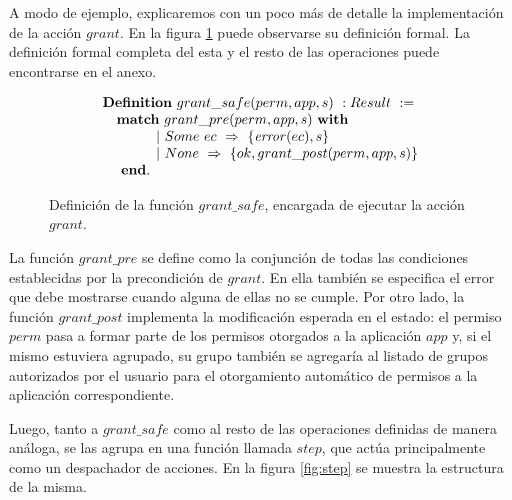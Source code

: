A modo de ejemplo, explicaremos con un poco más de detalle la implementación de la acción $grant$.
En la figura \ref{fig:install_action} puede observarse su definición formal. La definición formal
completa del esta y el resto de las operaciones puede encontrarse en el anexo.

\begin{figure}[ht]
    \begin{displaymath}
        \begin{array}{l}
            \textbf{Definition}\ grant\_safe(perm, app, s)\ : Result\ :=                \\
            \quad \textbf{match}\ grant\_pre(perm, app, s)\ \textbf{with}               \\
            \quad \hspace{1cm} |\ Some\ ec\ \Rightarrow\ \{\ap{error}{ec},s\}           \\
            \quad \hspace{1cm} |\ None\ \Rightarrow\ \{ok, grant\_post(perm, app, s) \} \\
            \quad\ \textbf{end}.                                                        \\
        \end{array}
    \end{displaymath}
    \caption{Definición de la función $grant\_safe$, encargada de ejecutar la acción $grant$.}
    \label{fig:install_action}
\end{figure}

La función $grant\_pre$ se define como la conjunción de todas las condiciones establecidas por la
precondición de $grant$. En ella también se especifica el error que debe mostrarse cuando alguna de
ellas no se cumple. Por otro lado, la función $grant\_post$ implementa la modificación esperada en el
estado: el permiso $perm$ pasa a formar parte de los permisos otorgados a la aplicación $app$ y, si
el mismo estuviera agrupado, su grupo también se agregaría al listado de grupos autorizados por el
usuario para el otorgamiento automático de permisos a la aplicación correspondiente.

Luego, tanto a $grant\_safe$ como al resto de las operaciones definidas de manera análoga, se las
agrupa en una función llamada $step$, que actúa principalmente como un despachador de acciones. En
la figura \ref{fig:step} se muestra la estructura de la misma.

